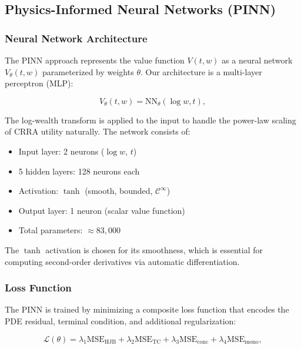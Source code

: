 \documentclass[12pt,a4paper]{article}
\newcommand{\HJB}{\text{HJB}}
\newcommand{\mse}{\text{MSE}}
\newcommand{\loss}{\mathcal{L}}
\begin{document}
\subsection{Physics-Informed Neural Networks (PINN)}
\label{sec:pinn}

\subsubsection{Neural Network Architecture}

The PINN approach represents the value function $V(t, w)$ as a neural network $V_\theta(t, w)$ parameterized by weights $\theta$. Our architecture is a multi-layer perceptron (MLP):

\begin{equation}
\label{eq:pinn_architecture}
V_\theta(t, w) = \text{NN}_\theta(\log w, t),
\end{equation}

The log-wealth transform is applied to the input to handle the power-law scaling of CRRA utility naturally. The network consists of:

\begin{itemize}
    \item Input layer: 2 neurons ($\log w$, $t$)
    \item 5 hidden layers: 128 neurons each
    \item Activation: $\tanh$ (smooth, bounded, $\mathcal{C}^\infty$)
    \item Output layer: 1 neuron (scalar value function)
    \item Total parameters: $\approx 83,000$
\end{itemize}

The $\tanh$ activation is chosen for its smoothness, which is essential for computing second-order derivatives via automatic differentiation.

\subsubsection{Loss Function}

The PINN is trained by minimizing a composite loss function that encodes the PDE residual, terminal condition, and additional regularization:

\begin{equation}
\label{eq:pinn_loss}
\loss(\theta) = \lambda_1 \mse_\HJB + \lambda_2 \mse_{\text{TC}} + \lambda_3 \mse_{\text{conc}} + \lambda_4 \mse_{\text{mono}},
\end{equation}
\end{document}
